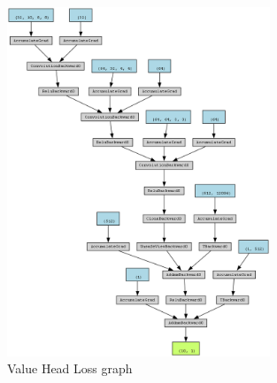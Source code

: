 \begin{figure}
    \centering
    \includegraphics[width=0.7\textwidth]{Bilder/value_graph.png}
    \caption{Value Head Loss graph}
    \label{fig:value_graph}
\end{figure}


